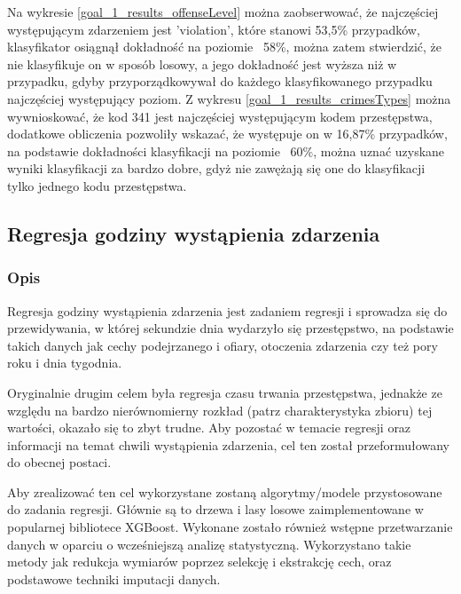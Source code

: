\documentclass{classrep}
\begin{document}
{{{                Na wykresie \ref{goal_1_results_offenseLevel} można zaobserwować, że najczęściej występującym zdarzeniem jest 'violation', które stanowi 53,5\% przypadków, klasyfikator osiągnął dokładność na poziomie ~58\%, można zatem stwierdzić, że nie klasyfikuje on w sposób losowy, a jego dokładność jest wyższa niż w przypadku, gdyby przyporządkowywał do każdego klasyfikowanego przypadku najczęściej występujący poziom.
                Z wykresu \ref{goal_1_results_crimesTypes} można wywnioskować, że kod 341 jest najczęściej występującym kodem przestępstwa, dodatkowe obliczenia pozwoliły wskazać, że występuje on w 16,87\% przypadków, na podstawie dokładności klasyfikacji na poziomie ~60\%, można uznać uzyskane wyniki klasyfikacji za bardzo dobre, gdyż nie zawężają się one do klasyfikacji tylko jednego kodu przestępstwa.
            }
        }
        \clearpage

        \subsection{Regresja godziny wystąpienia zdarzenia} \label{project_goal_2} {
        
            \subsubsection{Opis} {
                Regresja godziny wystąpienia zdarzenia jest zadaniem regresji i sprowadza się do przewidywania, w której sekundzie dnia wydarzyło się przestępstwo, na podstawie takich danych jak cechy podejrzanego i ofiary, otoczenia zdarzenia czy też pory roku i dnia tygodnia.

                Oryginalnie drugim celem była regresja czasu trwania przestępstwa, jednakże ze względu na bardzo nierównomierny rozkład (patrz charakterystyka zbioru) tej wartości, okazało się to zbyt trudne. Aby pozostać w temacie regresji oraz informacji na temat chwili wystąpienia zdarzenia, cel ten został przeformułowany do obecnej postaci. 

                Aby zrealizować ten cel wykorzystane zostaną algorytmy/modele przystosowane do zadania regresji. Głównie są to drzewa i lasy losowe zaimplementowane w popularnej bibliotece XGBoost. Wykonane zostało również wstępne przetwarzanie danych w oparciu o wcześniejszą analizę statystyczną. Wykorzystano takie metody jak redukcja wymiarów poprzez selekcję i ekstrakcję cech, oraz podstawowe techniki imputacji danych.
            }

}}
\end{document}
